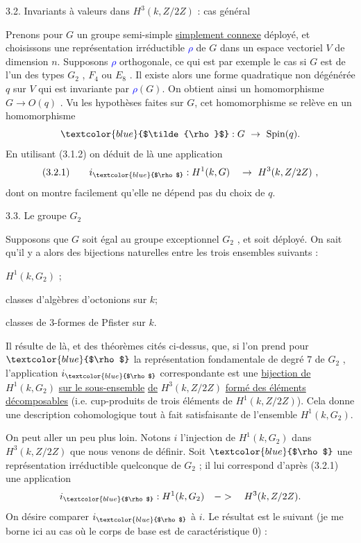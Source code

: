 \documentclass[11pt]{article}
\newcommand{\scanpage}[1]{\par\bigskip\noindent{\small\sffamily[scan #1]}\par}
\newcommand{\mspage}[1]{{\small\sffamily[p.\,#1]}}
\newcommand{\hand}[1]{\textcolor{blue}{#1}}
\newcommand{\uline}[1]{\underline{#1}}
\begin{document}
3.2. Invariants à valeurs dans $H^3(k, Z/2Z)$ : cas général

Prenons pour $G$ un groupe semi-simple \uline{simplement connexe} déployé,
et choisissons une représentation irréductible \hand{$\rho$} de $G$ dans un
espace vectoriel $V$ de dimension $n$. Supposons \hand{$\rho$} orthogonale, ce qui
est par exemple le cas si $G$ est de l'un des types $G_2$ , $F_4$ ou $E_8$ . Il existe
alors une forme quadratique non dégénérée $q$ sur $V$ qui est invariante
par \hand{$\rho$}$(G)$. On obtient ainsi un homomorphisme $G \to O(q)$ . Vu
les hypothèses faites sur $G$, cet homomorphisme se relève en un homomorphisme
\[ \hand{$\tilde{\rho}$} : G \ \to \ \mathrm{Spin}(q). \]
En utilisant (3.1.2) on déduit de là une application
\[ (3.2.1) \qquad i_{\hand{$\rho$}} : H^1(k, G) \quad \to \ H^3(k, Z/2Z) \ , \]
dont on montre facilement qu'elle ne dépend pas du choix de $q$.

\mspage{\hand{291}}

\clearpage
\scanpage{119/292}
\mspage{- 5 -}

3.3. Le groupe $G_2$

Supposons que $G$ soit égal au groupe exceptionnel $G_2$ , et soit déployé.
On sait qu'il y a alors des bijections naturelles entre les trois ensembles
suivants :

$H^1(k, G_2)$ ;

classes d'algèbres d'octonions sur $k$;

classes de 3-formes de Pfister sur $k$.

Il résulte de là, et des théorèmes cités ci-dessus, que, si l'on prend
pour $\hand{$\rho$}$ la représentation fondamentale de degré $7$ de $G_2$ , l'application
$i_{\hand{$\rho$}}$ correspondante est une \uline{bijection de} $H^1(k, G_2)$ \uline{sur le sous-ensemble}
\uline{de} $H^3(k, Z/2Z)$ \uline{formé des éléments décomposables} (i.e. cup-produits
de trois éléments de $H^1(k, Z/2Z)$). Cela donne une description cohomologique
tout à fait satisfaisante de l'ensemble $H^1(k, G_2)$.

On peut aller un peu plus loin. Notons $i$ l'injection de $H^1(k, G_2)$
dans $H^3(k, Z/2Z)$ que nous venons de définir. Soit $\hand{$\rho$}$ une représentation
irréductible quelconque de $G_2$ ; il lui correspond d'après (3.2.1) une
application
\[ i_{\hand{$\rho$}} : H^1(k, G_2) \quad -> \quad H^3(k, Z/2Z). \]
On désire comparer $i_{\hand{$\rho$}}$ à $i$. Le résultat est le suivant (je me borne
ici au cas où le corps de base est de caractéristique $0$) :
\end{document}
